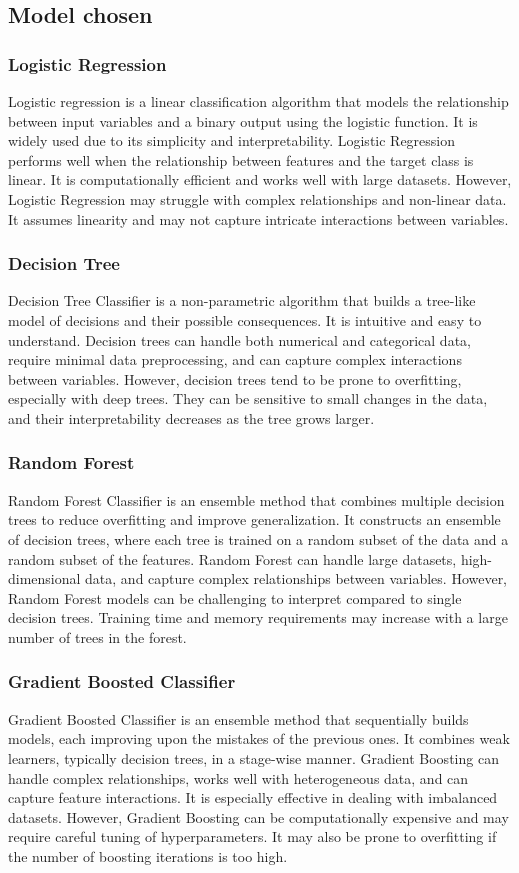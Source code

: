 \documentclass[12pt]{report}
\begin{document}
\subsection{Model chosen}
\subsubsection{Logistic Regression}
Logistic regression is a linear classification algorithm that models the relationship between input variables and a binary output using the logistic function. It is widely used due to its simplicity and interpretability. Logistic Regression performs well when the relationship between features and the target class is linear. It is computationally efficient and works well with large datasets. However, Logistic Regression may struggle with complex relationships and non-linear data. It assumes linearity and may not capture intricate interactions between variables.
\subsubsection{Decision Tree}
Decision Tree Classifier is a non-parametric algorithm that builds a tree-like model of decisions and their possible consequences. It is intuitive and easy to understand. Decision trees can handle both numerical and categorical data, require minimal data preprocessing, and can capture complex interactions between variables. However, decision trees tend to be prone to overfitting, especially with deep trees. They can be sensitive to small changes in the data, and their interpretability decreases as the tree grows larger.

\subsubsection{Random Forest}
Random Forest Classifier is an ensemble method that combines multiple decision trees to reduce overfitting and improve generalization. It constructs an ensemble of decision trees, where each tree is trained on a random subset of the data and a random subset of the features. Random Forest can handle large datasets, high-dimensional data, and capture complex relationships between variables. However, Random Forest models can be challenging to interpret compared to single decision trees. Training time and memory requirements may increase with a large number of trees in the forest.
\subsubsection{Gradient Boosted Classifier}
Gradient Boosted Classifier is an ensemble method that sequentially builds models, each improving upon the mistakes of the previous ones. It combines weak learners, typically decision trees, in a stage-wise manner. Gradient Boosting can handle complex relationships, works well with heterogeneous data, and can capture feature interactions. It is especially effective in dealing with imbalanced datasets. However, Gradient Boosting can be computationally expensive and may require careful tuning of hyperparameters. It may also be prone to overfitting if the number of boosting iterations is too high.
\end{document}
